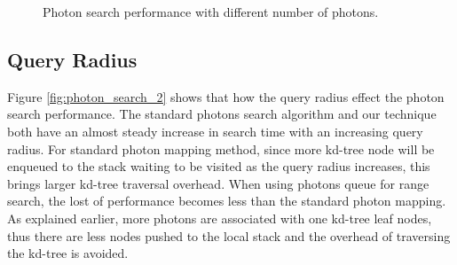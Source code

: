 \begin{figure}[ftp] 
    \centering 
    \renewcommand{\thefigure}{\thechapter.\arabic{figure}}
    \caption[Photon search performance with different number of photons]{Photon search performance with different number of photons. }
    \label{fig:photon_search_1}  
\end{figure} 

\subsection{Query Radius}

Figure \ref{fig:photon_search_2} shows that how the query radius effect the photon search performance. The standard photons search algorithm and our technique both have an almost steady increase in search time with an increasing query radius. For standard photon mapping method, since more kd-tree node will be enqueued to the stack waiting to be visited as the query radius increases, this brings larger kd-tree traversal overhead. When using photons queue for range search, the lost of performance becomes less than the standard photon mapping. As explained earlier, more photons are associated with one kd-tree leaf nodes, thus there are less nodes pushed to the local stack and the overhead of traversing the kd-tree is avoided. 


